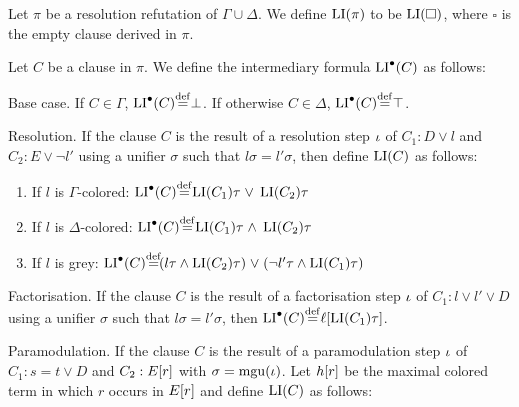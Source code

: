 \begin{defi}
	Let $\pi$ be a resolution refutation of $\Gamma \cup \Delta$.
	We define $\operatorname{LI}(\pi)$ to be $\operatorname{LI}(\square)$, where $\square$ is the empty clause derived in $\pi$.

	Let $C$ be a clause in $\pi$. 
	We define the intermediary formula $\operatorname{LI}^\bullet(C)$ as follows:
	\begin{description}
		\item{} Base case.
			If $C \in \Gamma$, $\LI^\bullet(C) \defeq \bot$.
			If otherwise $C \in \Delta$, $\LI^\bullet(C) \defeq \top$.

		\item{} Resolution.
			If the clause $C$ is the result of a resolution step $\iota$ of $C_1: D \lor l$ and $C_2: E \lor \lnot l'$ using a unifier $\sigma$ such that $l\sigma =  l'\sigma$, then define $\operatorname{LI}(C)$ as follows:
			\begin{enumerate}
				\item If $l$ is $\Gamma$-colored:
					$\LIpre(C) \defeq \LI(C_1)\tau\spas\lor \LI(C_2)\tau $

				\item If $l$ is $\Delta$-colored:
					$\LIpre(C) \defeq \LI(C_1)\tau\spas\land \LI(C_2)\tau$

				\item If $l$ is grey:
					$\LIpre(C) \defeq
					(l\tau \land \LI(C_2)\tau) \spas\lor
					(\lnot l'\tau\land \LI(C_1)\tau)
					$

			\end{enumerate}

		\item{} Factorisation.
			If the clause $C$ is the result of a factorisation step $\iota$ of $C_1: l \lor l' \lor D$ using a unifier $\sigma$ such that $l\sigma = l'\sigma$, then $\LIpre(C) \defeq \lifboth{\LI(C_1)\tau}$.

		\item{} Paramodulation.
			If the clause $C$ is the result of a paramodulation step $\iota$ of $C_1 : s = t \lor D$ and $C_2: E[r]$ with $\sigma = \operatorname{mgu}(\iota)$.
			Let $h[r]$ be the maximal colored term in which $r$ occurs in $E[r]$
			and define $\operatorname{LI}(C)$ as follows:


\end{description}
\end{defi}

